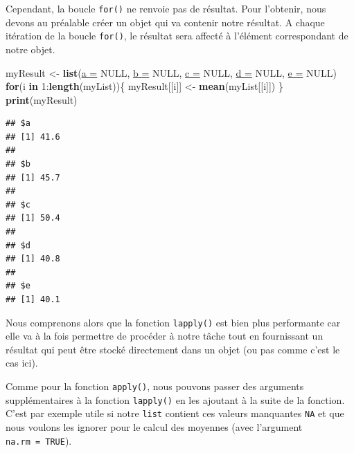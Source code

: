 \documentclass[twoside,symmetric]{book}
\newenvironment{Shaded}{}{}
\newcommand{\ControlFlowTok}[1]{\textbf{#1}}
\newcommand{\DataTypeTok}[1]{\underline{#1}}
\newcommand{\DecValTok}[1]{#1}
\newcommand{\KeywordTok}[1]{\textbf{#1}}
\newcommand{\NormalTok}[1]{#1}
\newcommand{\OperatorTok}[1]{#1}
\newcommand{\OtherTok}[1]{#1}
\newcommand{\StringTok}[1]{#1}
\begin{document}
Cependant, la boucle \texttt{for()} ne renvoie pas de résultat. Pour l'obtenir, nous devons au préalable créer un objet qui va contenir notre résultat. A chaque itération de la boucle \texttt{for()}, le résultat sera affecté à l'élément correspondant de notre objet.

\begin{Shaded}
\begin{Highlighting}[]
\NormalTok{myResult <-}\StringTok{ }\KeywordTok{list}\NormalTok{(}\DataTypeTok{a =} \OtherTok{NULL}\NormalTok{, }\DataTypeTok{b =} \OtherTok{NULL}\NormalTok{, }\DataTypeTok{c =} \OtherTok{NULL}\NormalTok{, }
  \DataTypeTok{d =} \OtherTok{NULL}\NormalTok{, }\DataTypeTok{e =} \OtherTok{NULL}\NormalTok{)}
\ControlFlowTok{for}\NormalTok{(i }\ControlFlowTok{in} \DecValTok{1}\OperatorTok{:}\KeywordTok{length}\NormalTok{(myList))\{}
\NormalTok{  myResult[[i]] <-}\StringTok{ }\KeywordTok{mean}\NormalTok{(myList[[i]])}
\NormalTok{\}}
\KeywordTok{print}\NormalTok{(myResult)}
\end{Highlighting}
\end{Shaded}

\begin{verbatim}
## $a
## [1] 41.6
## 
## $b
## [1] 45.7
## 
## $c
## [1] 50.4
## 
## $d
## [1] 40.8
## 
## $e
## [1] 40.1
\end{verbatim}

Nous comprenons alors que la fonction \texttt{lapply()} est bien plus performante car elle va à la fois permettre de procéder à notre tâche tout en fournissant un résultat qui peut être stocké directement dans un objet (ou pas comme c'est le cas ici).

Comme pour la fonction \texttt{apply()}, nous pouvons passer des arguments supplémentaires à la fonction \texttt{lapply()} en les ajoutant à la suite de la fonction. C'est par exemple utile si notre \texttt{list} contient ces valeurs manquantes \texttt{NA} et que nous voulons les ignorer pour le calcul des moyennes (avec l'argument \texttt{na.rm\ =\ TRUE}).
\end{document}
